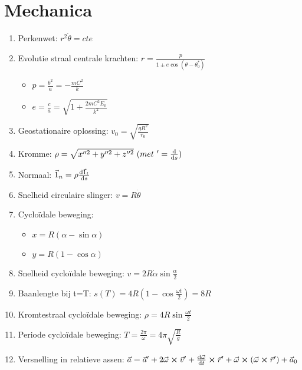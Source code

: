 \documentclass[12pt]{article}
\begin{document}
    \maketitle
	
    \section{Mechanica}
    \label{sec:mechanica}
    
    \begin{enumerate}
	    \item Perkenwet: $ r^2 \dot{\theta} = cte $
	    \item Evolutie straal centrale krachten: $ r = \frac{p}{1\pm e \cos{(\theta - \theta_0^{*} )}} $
		    \begin{itemize}
			    \item $ p = \frac{b^2}{a} = - \frac{mC^2}{k} $
			    \item  $ e = \frac{c}{a} = \sqrt{ 1 + \frac{2mC^2 E_0}{k^2} }$
		    \end{itemize}
    	    \item Geostationaire oplossing: $ v_0 = \sqrt{ \frac{gR^2}{r_0} }$
	    \item Kromme: $ \rho = \sqrt{x''^2 + y''^2 + z''^2 }\ (met\ '=\dv{}{s}) $
	    \item Normaal: $ \vec{1}_n = \rho \dv{\vec{1}_t}{s} $
	    \item Snelheid circulaire slinger: $ v = R \dot{\theta} $
	    \item Cyclo\"idale beweging: 
		    \begin{itemize}
			    \item $x = R{(\alpha - \sin{\alpha} )} $
			    \item $y = R{(1 - \cos{\alpha} )} $
		    \end{itemize}
	    \item Snelheid cyclo\"idale beweging: $ v = 2 R \dot{\alpha} \sin{\frac{\alpha}{2}} $
	    \item Baanlengte bij t=T: $ s(T) = 4R{(1-\cos{\frac{\omega t}{2}})} = 8R$
	    \item Kromtestraal cyclo\"idale beweging:  $ \rho = 4R \sin{\frac{\omega t}{2}} $
	    \item Periode cyclo\"idale beweging:  $ T = \frac{2\pi}{\omega} = 4\pi \sqrt{\frac{R}{g}}$
	    \item Versnelling in relatieve assen:  $ \vec{a} = \vec{a}' + 2\vec{\omega} \cross \vec{v}' + \dv{\vec{\omega}}{t} \cross \vec{r}' + \vec{\omega} \cross {(\vec{\omega} \cross \vec{r}' )} + \vec{a}_0 $

\end{enumerate}
\end{document}
